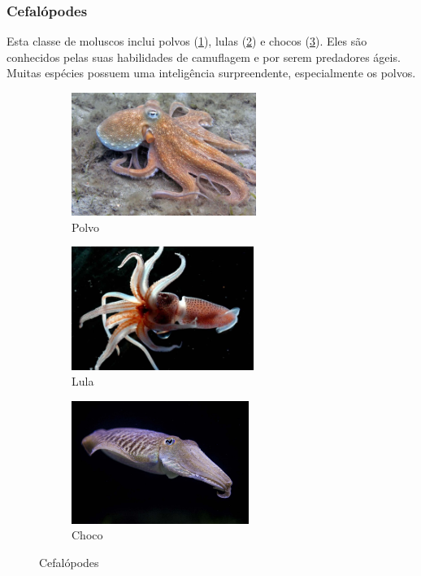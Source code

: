 \documentclass{report}
\begin{document}
\subsubsection{Cefalópodes}
Esta classe de moluscos inclui polvos (\ref{fig:polvo}), lulas (\ref{fig:lula}) e chocos (\ref{fig:choco}). Eles são conhecidos pelas suas habilidades de camuflagem e por serem predadores ágeis. Muitas espécies possuem uma inteligência surpreendente, especialmente os polvos.

\begin{figure}[H]
\center
    \begin{subfigure}{.5\textwidth}
    \center
        \includegraphics[height=4cm]{imagens/polvo.jpg}
        \caption{Polvo}
        \label{fig:polvo}
    \end{subfigure}%
    \hfill
    \begin{subfigure}{.5\textwidth}
    \center
        \includegraphics[height=4cm]{imagens/lula.jpg}
        \caption{Lula}
        \label{fig:lula}
    \end{subfigure}%
    \hfill
    \begin{subfigure}{.5\textwidth}
    \center    
        \includegraphics[height=4cm]{imagens/choco.jpg}
        \caption{Choco}
        \label{fig:choco}
    \end{subfigure}
    \caption{Cefalópodes}
    \label{fig:cefalopodes}
\end{figure}
\end{document}
